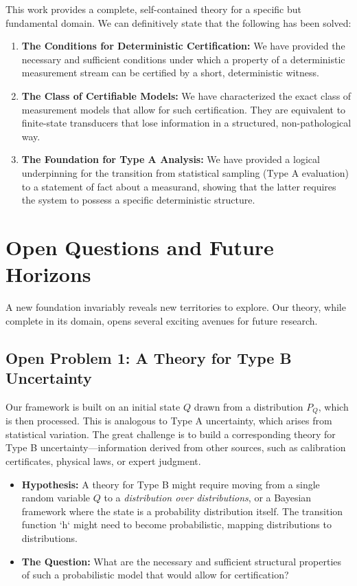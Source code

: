 \documentclass[12pt]{article}
\begin{document}
This work provides a complete, self-contained theory for a specific but fundamental domain. We can definitively state that the following has been solved:

\begin{enumerate}
    \item \textbf{The Conditions for Deterministic Certification:} We have provided the necessary and sufficient conditions under which a property of a deterministic measurement stream can be certified by a short, deterministic witness.
    \item \textbf{The Class of Certifiable Models:} We have characterized the exact class of measurement models that allow for such certification. They are equivalent to finite-state transducers that lose information in a structured, non-pathological way.
    \item \textbf{The Foundation for Type A Analysis:} We have provided a logical underpinning for the transition from statistical sampling (Type A evaluation) to a statement of fact about a measurand, showing that the latter requires the system to possess a specific deterministic structure.
\end{enumerate}

\section{Open Questions and Future Horizons}

A new foundation invariably reveals new territories to explore. Our theory, while complete in its domain, opens several exciting avenues for future research.

\subsection{Open Problem 1: A Theory for Type B Uncertainty}
Our framework is built on an initial state $Q$ drawn from a distribution $P_Q$, which is then processed. This is analogous to Type A uncertainty, which arises from statistical variation. The great challenge is to build a corresponding theory for Type B uncertainty—information derived from other sources, such as calibration certificates, physical laws, or expert judgment.

\begin{itemize}
    \item \textbf{Hypothesis:} A theory for Type B might require moving from a single random variable $Q$ to a \emph{distribution over distributions}, or a Bayesian framework where the state is a probability distribution itself. The transition function `h` might need to become probabilistic, mapping distributions to distributions.
    \item \textbf{The Question:} What are the necessary and sufficient structural properties of such a probabilistic model that would allow for certification?
\end{itemize}
\end{document}
